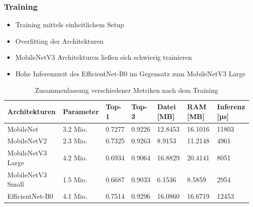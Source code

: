 \documentclass{beamer}
\begin{document}
\begin{frame}
\frametitle{Training}

\begin{itemize}
	\item Training mittels einheitlichem Setup
	\item Overfitting der Architekturen
	\item MobileNetV3 Architekturen ließen sich schwierig trainieren
	\item Hohe Inferenzzeit des EfficientNet-B0 im Gegensatz zum MobileNetV3 Large
\end{itemize}

\begin{table}
\tiny
\centering
\begin{tabular}{lllllll}
\hline
    Architekturen & Parameter & Top-1  & Top-3  & Datei [MB] & RAM [MB] & Inferenz [µs] \\
\hline
        MobileNet &  3.2 Mio. & 0.7277 & 0.9226 &    12.8453 &  16.1016 &         11803 \\
      MobileNetV2 &  2.3 Mio. & 0.7325 & 0.9263 &    8.9153 &  11.2148 &          4961 \\
MobileNetV3 Large &  4.2 Mio. & 0.6934 & 0.9064 &   16.8829 &  20.4141 &          8051 \\
MobileNetV3 Small &  1.5 Mio. & 0.6687 & 0.9033 &    6.1536 &   8.5859 &          2954 \\
  EfficientNet-B0 &  4.1 Mio. & 0.7514 & 0.9296 &   16.0860 &  16.6719 &         12453 \\
\hline
\end{tabular}
\caption{Zusammenfassung verschiedener Metriken nach dem Training}
\end{table}

\end{frame}
\end{document}

